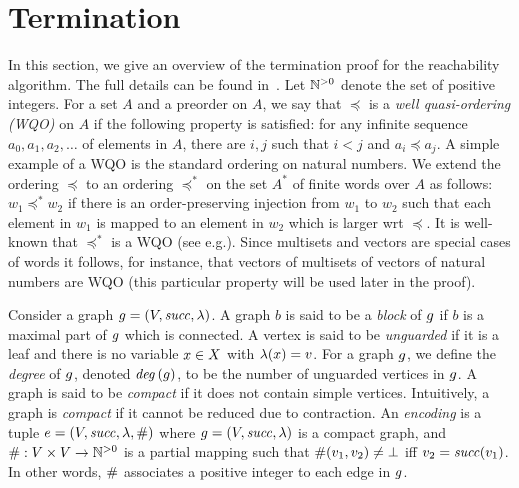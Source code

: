 \newcommand{\block}{b}
\section{Termination}
\label{termination:section}

In this section, we give an overview of the termination proof for
the reachability algorithm.
%
The full details can be found in~\cite{it:2008-015}.
%
Let ${\mathbb N}^{>0}$ denote the set of positive integers.
%
For a set $A$ and a preorder on $A$, we say that $\preceq$ is 
a {\it well quasi-ordering (WQO)} on $A$ if the following property is
satisfied:
for any infinite sequence $a_0,a_1,a_2,\ldots$ of elements in $A$, there are 
$i,j$  such that $i<j$ and $a_i\preceq a_j$.
%
A simple example of a WQO is the standard ordering on natural numbers.
%
We extend the ordering $\preceq$ to an ordering $\preceq^*$ on
the set $A^*$ of finite words over $A$ as follows:
$w_1 \preceq^* w_2$ if there is an order-preserving injection
from $w_1$ to $w_2$ such that each element in $w_1$ is mapped to an element
in $w_2$ which is larger wrt $\preceq$.
%
It is well-known that $\preceq^*$ is a WQO (see e.g.\cite{ACJT00}).
%
Since multisets and vectors are special cases of words it follows,
for instance, that vectors of multisets of vectors of natural numbers are WQO
(this particular property will be used later in the proof).

%

Consider a graph $g=\left(V,{\it succ},\lambda\right)$.
%
A graph $\block$ is said to be a {\it block}
of $g$ if $\block$ is a maximal part of $g$ which is connected.
%
A vertex is said to be {\it unguarded} if it is a leaf and there is no
variable $x\in X$ with $\lambda(x)=v$.
%
For a graph $g$,
we define the {\it degree} of $g$, denoted ${\it deg}\left(g\right)$, to be
the number of unguarded vertices in $g$.
%
A graph is said to be {\it compact} if it does not contain simple vertices.
%
Intuitively, a graph is {\it compact} if it cannot be reduced
due to contraction.
%
An {\it encoding} is a tuple $e=\left(V,{\it succ},\lambda,\#\right)$ where
$g=\left(V,{\it succ},\lambda\right)$ is a compact graph, and
$\#:V\times V\rightarrow{\mathbb N}^{>0}$ is a partial mapping such that
$\#(v_1,v_2)\neq\bot$ iff $v_2={\it succ}(v_1)$.
%
In other words, $\#$ associates a positive integer to each edge in $g$.
%
%

